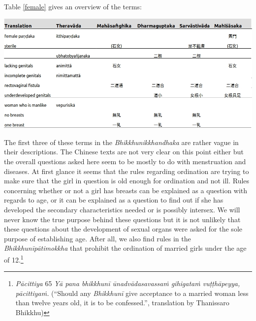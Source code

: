 Table \ref{female} gives an overview of the terms:

\bigskip
\includegraphics[width=\textwidth]{female.jpg}
\begin{minipage}{\textwidth}
\label{female}
\end{minipage}
\medskip

The first three of these terms in the {\em Bhikkhunikkhandhaka} are rather vague in their descriptions. The Chinese texts are not very clear on this point either but the overall questions asked here seem to be mostly to do with menstruation and diseases. At first glance it seems that the rules regarding ordination are trying to make sure that the girl in question is old enough for ordination and not ill. Rules concerning whether or not a girl has breasts can be explained as a question with regards to age, or it can be explained as a question to find out if she has developed the secondary characteristics needed or is possibly intersex. We will never know the true purpose behind these questions but it is not unlikely that these questions about the development of sexual organs were asked for the sole purpose of establishing age. After all, we also find rules in the {\em Bhikkhunīpātimokkha} that prohibit the ordination of married girls under the age of 12.\footnote{{\em Pācittiya} 65 {\em Yā pana bhikkhunī ūnad­vāda­sa­vassaṁ gihigataṁ vuṭṭhāpeyya, pācittiyaṁ.} (``Should any {\em Bhikkhunī} give acceptance to a married woman less than twelve years old, it is to be confessed.'', translation by Thanissaro Bhikkhu)} 


